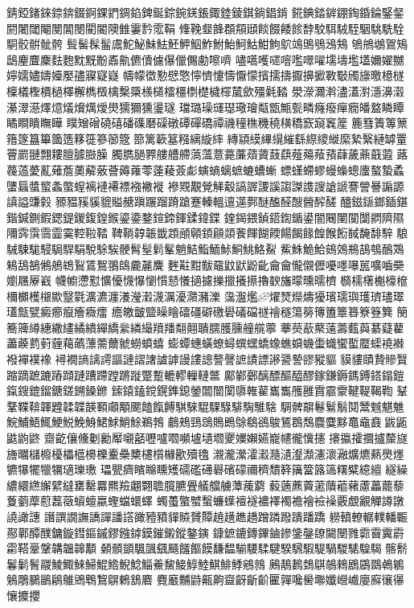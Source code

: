 錆錏鍺錸錼錛錣錒錁鍆錭錎錍鋋錝鋺錓鋹鋷錴錂錤鋿錩錹
錵錪錔錌錋鋾錉錀鋻錖閼闍閾閹閺閶閿閵閽隩雔霋霒霐鞙
鞗鞔韰韸頵頯頲餤餟餧餩馞駮駬駥駤駰駣駪駩駧骹骿骴骻
髶髺髹髷鬳鮀鮅鮇魼魾魻鮂鮓鮒鮐魺鮕魽鮈鴥鴗鴠鴞鴔鴩
鴝鴘鴢鴐鴙鴟麈麆麇麮麭黕黖黺鼒鼽儦儥儢儤儠儩勴嚓嚌
嚍嚆嚄嚃噾嚂噿嚁壖壔壏壒嬭嬥嬲嬣嬬嬧嬦嬯嬮孻寱寲嶷
幬幪徾懃憵憼懧懠懥懤懨懞擯擩擣擫擤擨斁斀斶旚曒檍檖
檁檥檉檟檛檡檞檇檓檎檕檃檨檤檑橿檦檚檅檌檒歛殭氉濌
澩濴濔濣濜濭濧濦濞濲濝濢濨燡燱燨燲燤燰燢獳獮獯璗璲
璫璐璪璭璱璥璯甐甑甒甏疄癃癈癉癇皤盩瞵瞫瞲瞷瞶瞴瞱
瞨矰磳磽礂磻磼磿磲礅磹磾礄禫禨穜穛穖穘穔穚窾竀竁簅
簏篲簀篿篻簎篴簋篳簂簉簃簁篸篽簆篰篱簐簊糨縭縼繂
縳顈縸縪繉繀繇縩繌縰縻縶繄縺罅罿罾罽翴翲耬膻臄臌臊
臅臇膼臩艛艚艜薃薀薏薧薕薠薋薣蕻薤薚薞蕷蕼薉薡蕺蕸
蕗薎薖薆薍薙薝薁薢薂薈薅蕹蕶薘薐薟虨螾螪螭蟅螰螬螹
螵螼螮蟉蟃蟂蟌螷螯蟄蟊螴螶螿螸螽蟞螲褵褳褼褾襁襒褷
襂覭覯覮觲觳謞謘謖謑謅謋謢謏謒謕謇謍謈謆謜謓謚豏豰
豲豱豯貕貔賹赯蹎蹍蹓蹐蹌蹇轃轀邅遾鄸醚醢醛醙醟醡醝
醠鎡鎃鎯鍤鍖鍇鍼鍘鍜鍶鍉鍐鍑鍠鍭鎏鍌鍪鍹鍗鍕鍒鍏鍱
鍷鍻鍡鍞鍣鍧鍎鍙闇闀闉闃闅閷隮隰隬霠霟霘霝霙鞚鞡鞜
鞞鞝韕韔韱顁顄顊顉顅顃餥餫餬餪餳餲餯餭餱餰馘馣馡騂
駺駴駷駹駸駶駻駽駾駼騃骾髾髽鬁髼魈鮚鮨鮞鮛鮦鮡鮥鮤
鮆鮢鮠鮯鴳鵁鵧鴶鴮鴯鴱鴸鴰鵅鵂鵃鴾鴷鵀鴽翵鴭麊麉麍
麰黈黚黻黿鼤鼣鼢齔⿕龠儱儭儮嚘嚜嚗嚚嚝嚙奰嬼屩屪巀
幭幮懘懟懭懮懱懪懰懫懖懩擿攄擽擸攁攃擼斔旛曚曛曘櫅
檹檽櫡櫆檺檶檷櫇檴檭歞毉氋瀇瀌瀍瀁瀅瀔瀎濿瀀濻瀦濼
濷瀊爁燿燹爃燽獶璸瓀璵瓁璾璶璻瓂甔甓癜癤癙癐癓癗
癚皦皽盬矂瞺礌礓礔礉礐礒礑禭禬穟簜簩簙簠簟簭簝簦簨
簢簥簰繜繐繖繣繘繢繟繑繠繗繓羵羳翷翸聵臑臒臐艟艞薴
藆藀藃藂薳薵薽藇藄薿藋藎藈藅薱薶藒蘤薸薷薾虩蟧蟦蟢
蟛蟫蟪蟥蟟蟳蟤蟔蟜蟓蟭蟘蟣蟗蟙蠁蟴蟨蟝襓襋襏襌襆襐
襑襉謪謧謣謳謰謵譇謯謼謾謱謥謷謦謶謮謤謻謽謺豂豵貙
貘貗賾贄贂贀蹜蹢蹠蹗蹖蹞蹥蹧蹛蹚蹡蹝蹩蹔轆轇轈轋鄨
鄺鄻鄾醨醥醧醯醪鎵鎌鎒鎷鎛鎝鎉鎧鎎鎪鎞鎦鎕鎈鎙鎟鎀
鎍鎱鎑鎲鎤鎨鎴鎣闒闓闑隳雗雚巂雟雘雝霣霢霥鞬鞮鞨鞫
鞤鞪鞢鞥韗韙韖韘韺顐顑顒颸饁餼餺騏騋騉騍騄騑騊騅騇
騆髀髜鬈鬄鬅鬩鬵魊魌魋鯇鯆鯃鮿鯁鮵鮸鯓鮶鯄鮹鮽鵜鵓
鵏鵊鵛鵋鵙鵖鵌鵗鵒鵔鵟鵘鵚麎麌黟鼁鼀鼖鼥鼫鼪鼩鼨
齌齕儴儵劖勷厴嚫嚭嚦嚧嚪嚬壚壝壛夒嬽嬾嬿巃幰徿懻攇
攐攍攉攌攎斄旞旝曞櫧櫠櫌櫑櫙櫋櫟櫜櫐櫫櫏櫍櫞歠殰氌
瀙瀧瀠瀖瀫瀡瀢瀣瀩瀗瀤瀜爌爊爇爂爅犥犦犤犣犡瓋瓅璷
瓃甖癠矉矊矄矱礝礛礡礜礗礞禰穧穨簳簼簹簬簻糬糪繶繵
繸繰繷繯繺繲繴繨罋罊羃羆羷翽翾聸臗臕舋艤艡艣藫藱藭
藙藡藨藚藗藬藲藸藘藟藣藜藑藰藦藯藞藢蠀蟺蠃蟶蟷蠉蠌
蠋蠆蟼蠈蟿蠊蠂襢襚襛襗襡襜襘襝襙覈覷覶觶譐譈譊譀譓
譖譔譋譕譑譂譒譗豃豷豶貚贆贇贉趬趪趭趫蹭蹸蹳蹪蹯蹻
軂轒轑轏轐轓辴酀鄿醰醭鏞鏇鏏鏂鏚鏐鏹鏬鏌鏙鎩鏦鏊鏔
鏮鏣鏕鏄鏎鏀鏒鎥鏧镽闚闛雡霩霫霬霨霦鞳鞷鞶韝韞韟顜
顙顝顗颿颽颻颾饈饇饃馦馧騚騕騥騝騤騛騢騠騧騣騞騜騔
髂鬋鬊鬎鬌鬷鯪鯫鯠鯞鯤鯦鯢鯰鯔鯗鯬鯜鯙鯥鯕鯡鯚鵷鶁
鶊鶄鶈鵱鶀鵸鶆鶋鶌鵽鵫鵴鵵鵰鵩鶅鵳鵻鶂鵯鵹鵿鶇鵨麔
麑黀黼鼭齀齁齍齖齗齘匷嚲嚵嚳壣孅巆巇廮廯忀忁懹攗攖
